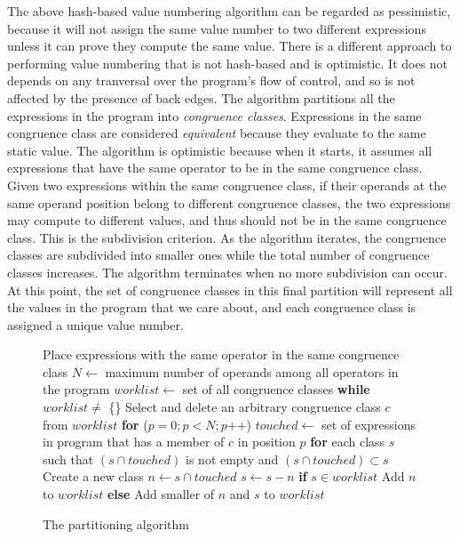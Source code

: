 The above hash-based value numbering algorithm can be regarded as pessimistic, 
because it will not assign the same value number to two different expressions 
unless it can prove they compute the same value.  There is a different approach
to performing value numbering that is not hash-based and is optimistic.
It does not depends on any tranversal over the program's flow of control, and
so is not affected by the presence of back edges.  The algorithm partitions 
all the expressions in the program into \emph{congruence classes}.  Expressions
in the same congruence class are considered \emph{equivalent} because they
evaluate to the same static value.  The algorithm is optimistic because  
when it starts, it assumes all expressions that have the same operator to be
in the same congruence class.  
Given two expressions within the same congruence class, if 
their operands at the same operand position belong to different congruence
classes, the two expressions may compute to different values, and thus should
not be in the same congruence class.  This is the subdivision 
criterion.  As the algorithm iterates, the congruence classes are subdivided
into smaller ones while the total number of congruence classes increases.
The algorithm terminates when no more subdivision can occur.  At this point,
the set of congruence classes in this final partition will represent all the
values in the program that we care about, and each congruence class is assigned
a unique value number.  

\begin{figure}[t]
\setcounter{linectr}{0}
\centering
\begin{minipage}[t]{6in}
\begin{code}
 Place expressions with the same operator in the same congruence class
 $N \leftarrow$ maximum number of operands among all operators in the program
 $worklist \leftarrow$ set of all congruence classes
 {\bf while} $worklist \neq$ \{\} 
    Select and delete an arbitrary congruence class $c$ from $worklist$
    {\bf for} ($p = 0; p < N; p$++)
      $touched \leftarrow$ set of expressions in program that has a member of $c$ in position $p$
      {\bf for} each class $s$ such that $(s \cap touched)$ is not empty and $(s \cap touched) \subset s$
        Create a new class $n \leftarrow s \cap touched$
        $s \leftarrow s - n$
        {\bf if} $s \in worklist$
           Add $n$ to $worklist$
        {\bf else}
           Add smaller of $n$ and $s$ to $worklist$
\end{code}
\end{minipage}
\caption{The partitioning algorithm}
\label{fig: partition-alg}
\end{figure}

